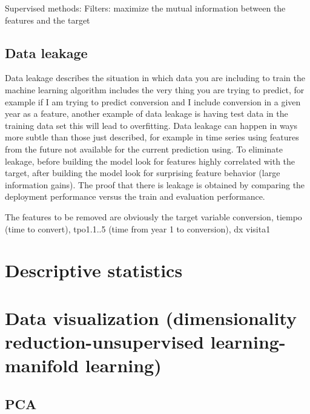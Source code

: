\documentclass[11pt]{article}
\begin{document}
Supervised methods: Filters: maximize the mutual information between the features and the target

\subsection{Data leakage}
Data leakage describes the situation in which data you are including to train the machine learning algorithm includes the very thing you are trying to predict, for example if I am trying to predict conversion and I include conversion in a given year as a feature, another example of data leakage is having test data in the training data set this will lead to overfitting. Data leakage can happen in ways more subtle than those just described, for example in time series using features from the future not available for the current prediction using. To eliminate leakage, before building the  model look for features highly correlated with the target, after building the model look for surprising feature behavior (large information gains). The proof that there is leakage is obtained by comparing the deployment performance versus the train and evaluation performance. 

The features to be removed are obviously the target variable conversion, tiempo (time to convert), tpo1.1..5 (time from year 1 to conversion), dx visita1

\section{Descriptive statistics}

\section{Data visualization (dimensionality reduction-unsupervised learning-manifold learning)}
\subsection{PCA}
\end{document}
